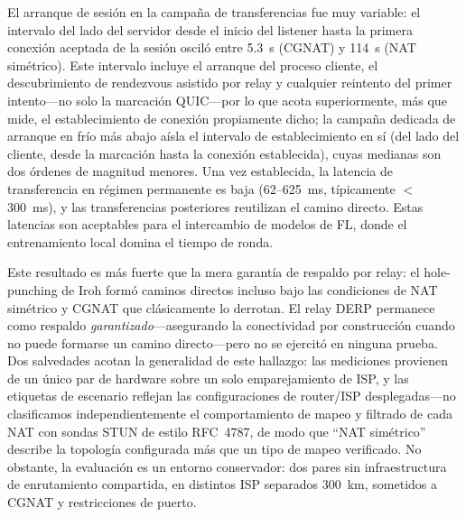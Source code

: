 \documentclass[journal]{IEEEtran}
\begin{document}
El arranque de sesión en la campaña de transferencias fue muy variable: el intervalo del lado del servidor desde el inicio del listener hasta la primera conexión aceptada de la sesión osciló entre 5.3~s (CGNAT) y 114~s (NAT simétrico). Este intervalo incluye el arranque del proceso cliente, el descubrimiento de rendezvous asistido por relay y cualquier reintento del primer intento---no solo la marcación QUIC---por lo que acota superiormente, más que mide, el establecimiento de conexión propiamente dicho; la campaña dedicada de arranque en frío más abajo aísla el intervalo de establecimiento en sí (del lado del cliente, desde la marcación hasta la conexión establecida), cuyas medianas son dos órdenes de magnitud menores. Una vez establecida, la latencia de transferencia en régimen permanente es baja (62--625~ms, típicamente $<$300~ms), y las transferencias posteriores reutilizan el camino directo. Estas latencias son aceptables para el intercambio de modelos de FL, donde el entrenamiento local domina el tiempo de ronda.

Este resultado es más fuerte que la mera garantía de respaldo por relay: el hole-punching de Iroh formó caminos directos incluso bajo las condiciones de NAT simétrico y CGNAT que clásicamente lo derrotan. El relay DERP permanece como respaldo \emph{garantizado}---asegurando la conectividad por construcción cuando no puede formarse un camino directo---pero no se ejercitó en ninguna prueba. Dos salvedades acotan la generalidad de este hallazgo: las mediciones provienen de un único par de hardware sobre un solo emparejamiento de ISP, y las etiquetas de escenario reflejan las configuraciones de router/ISP desplegadas---no clasificamos independientemente el comportamiento de mapeo y filtrado de cada NAT con sondas STUN de estilo RFC~4787, de modo que ``NAT simétrico'' describe la topología configurada más que un tipo de mapeo verificado. No obstante, la evaluación es un entorno conservador: dos pares sin infraestructura de enrutamiento compartida, en distintos ISP separados 300~km, sometidos a CGNAT y restricciones de puerto.
\end{document}
